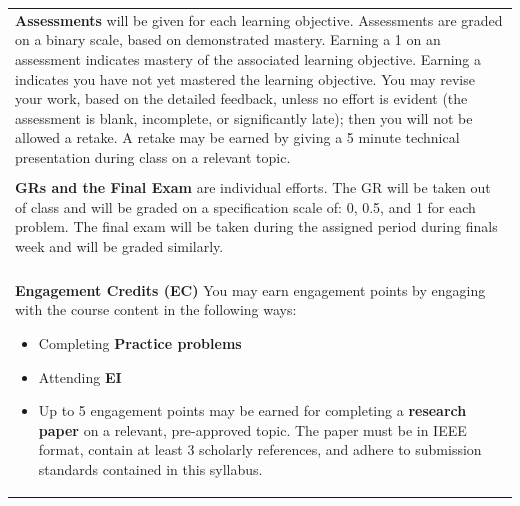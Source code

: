 \documentclass[12pt]{article}
\begin{document}
\begin{minipage}[c]{0.35\textwidth}
\begin{footnotesize}
\begin{tabular}{|p{\textwidth}}
	

	 \textbf{Assessments} will be given for each learning objective. Assessments are graded on a binary scale, based on demonstrated mastery. Earning a 1 on an assessment indicates mastery of the associated learning objective. Earning a  indicates you have not yet mastered the learning objective. You may revise your work, based on the detailed feedback, unless no effort is evident (the assessment is blank, incomplete, or significantly late); then you will not be allowed a retake. A retake may be earned by giving a 5 minute technical presentation during class on a relevant topic.\\
	
	\\
	
	 \textbf{GRs and the Final Exam} are individual efforts. The GR will be taken out of class and will be graded on a specification scale of: 0, 0.5, and 1 for each problem. The final exam will be taken during the assigned period during finals week and will be graded similarly.  \\
	
	\\
	
	\textbf{Engagement Credits (EC)} You may earn engagement points by engaging with the course content in the following ways:
	\begin{itemize}
		\item Completing \textbf{Practice problems}
		\item Attending \textbf{EI}
		\item Up to 5 engagement points may be earned for completing a \textbf{research paper} on a relevant, pre-approved topic. The paper must be in IEEE format, contain at least 3 scholarly references, and adhere to submission standards contained in this syllabus.
	\end{itemize}
	
\end{tabular}	
\vspace{-0.1in}
\end{footnotesize}
\end{minipage}

\vspace{-0.12in}
\end{document}

